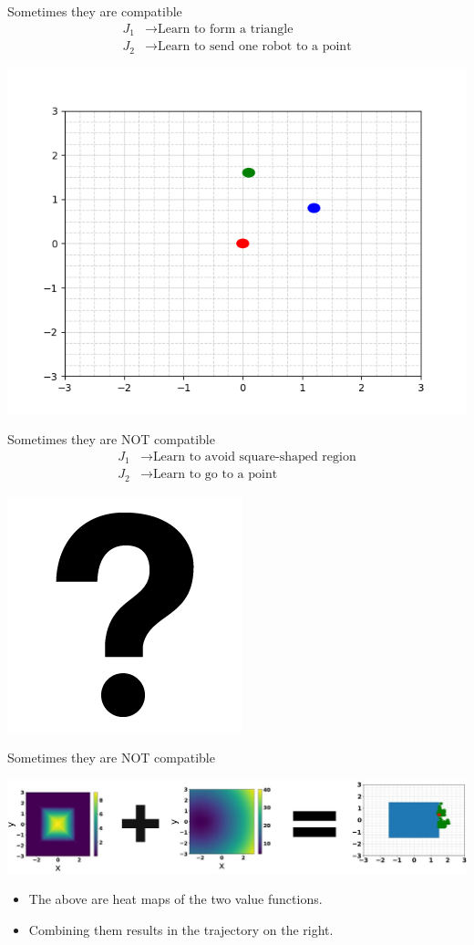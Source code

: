 \begin{frame}{Sometimes they are compatible}
	\begin{align*}
		{J}_1 &\rightarrow \textrm{Learn to form a triangle} \\
		{J}_2 &\rightarrow \textrm{Learn to send one robot to a point}
	\end{align*}
	\begin{minipage}{\textwidth}
		\centering		
		\includegraphics[width=0.5\linewidth]{triangleExample}
	\end{minipage}%
\end{frame}

\begin{frame}{Sometimes they are NOT compatible}
	\begin{align*}
		{J}_1 &\rightarrow \textrm{Learn to avoid square-shaped region} \\
		{J}_2 &\rightarrow \textrm{Learn to go to a point}
	\end{align*}
	\begin{minipage}{\textwidth}
		\centering		
		\includegraphics[width=0.3\linewidth]{questionMark}
	\end{minipage}%
\end{frame}

\begin{frame}{Sometimes they are NOT compatible}
	\begin{minipage}{\textwidth}
		\centering		
		\includegraphics[width=1.\linewidth]{diagramMath}
	\end{minipage}%
	\seprule
	\begin{itemize}
		\item{The above are heat maps of the two value functions.}
		\item{Combining them results in the trajectory on the right.}
	\end{itemize}
\end{frame}

